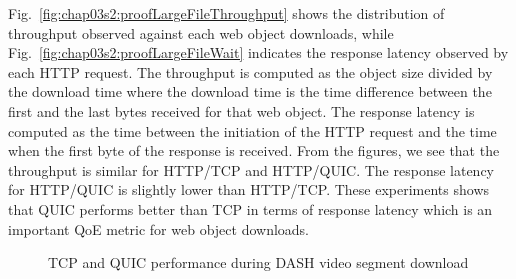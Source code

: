 Fig.~\ref{fig:chap03s2:proofLargeFileThroughput} shows the distribution of throughput observed against each web object downloads, while Fig.~\ref{fig:chap03s2:proofLargeFileWait} indicates the response latency observed by each HTTP request. The throughput is computed as the object size divided by the download time where the download time is the time difference between the first and the last bytes received for that web object. The response latency is computed as the time between the initiation of the HTTP request and the time when the first byte of the response is received. From the figures, we see that the throughput is similar for HTTP/TCP and HTTP/QUIC. The response latency for HTTP/QUIC is slightly lower than HTTP/TCP. These experiments shows that QUIC performs better than TCP in terms of response latency which is an important QoE metric for web object downloads. 


\begin{figure}[!ht]
	\captionsetup[subfigure]{}
	\begin{center}
		\hfill
	\end{center}
	\caption{\label{fig:chap03s2:dashcomp}TCP and QUIC performance during DASH video segment download}
\end{figure}


